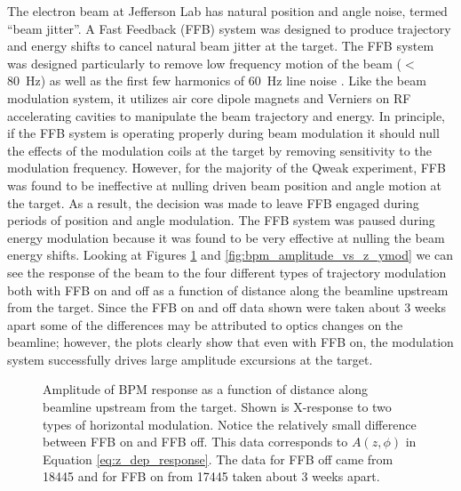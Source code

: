 The electron beam at Jefferson Lab has natural position and angle noise, termed ``beam jitter''. A Fast Feedback (FFB) system was designed to produce trajectory and energy shifts to cancel natural beam jitter at the target. The FFB system was designed particularly to remove low frequency motion of the beam ($<$80~Hz) as well as the first few harmonics of 60~Hz line noise \cite{Lebedev}. Like the beam modulation system, it utilizes air core dipole magnets and Verniers on RF accelerating cavities to manipulate the beam trajectory and energy. In principle, if the FFB system is operating properly during beam modulation it should null the effects of the modulation coils at the target by removing sensitivity to the modulation frequency. However, for the majority of the Qweak experiment, FFB was found to be ineffective at nulling driven beam position and angle motion at the target. As a result, the decision was made to leave FFB engaged during periods of position and angle modulation. The FFB system was paused during energy modulation because it was found to be very effective at nulling the beam energy shifts. Looking at Figures \ref{fig:bpm_amplitude_vs_z_xmod} and \ref{fig:bpm_amplitude_vs_z_ymod} we can see the response of the beam to the four different types of trajectory modulation both with FFB on and off as a function of distance along the beamline upstream from the target. Since the FFB on and off data shown were taken about 3 weeks apart some of the differences may be attributed to optics changes on the beamline; however, the plots clearly show that even with FFB on, the modulation system successfully drives large amplitude excursions at the target.
\begin{figure}[ht]
\centering
{}
\caption{Amplitude of BPM response as a function of distance along beamline upstream from the target. Shown is X-response to two types of horizontal modulation. Notice the relatively small difference between FFB on and FFB off. This data corresponds to $A(z,\phi)$ in Equation \ref{eq:z_dep_response}. The data for FFB off came from 18445 and for FFB on from 17445 taken about 3 weeks apart.}
\label{fig:bpm_amplitude_vs_z_xmod}
\end{figure}
